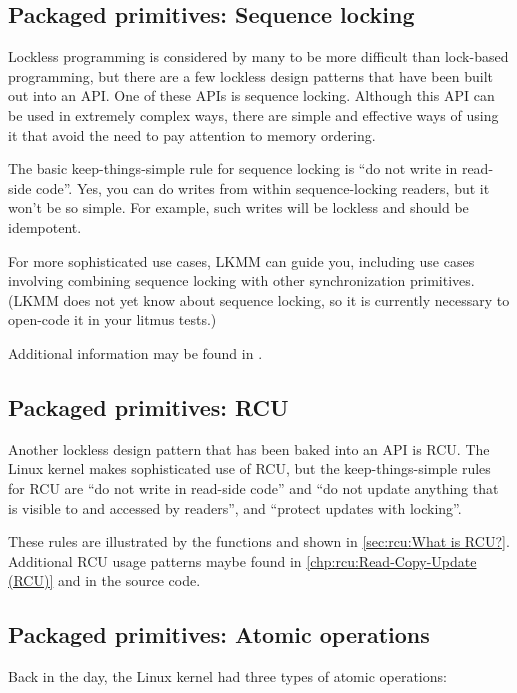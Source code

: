 \subsection{Packaged primitives: Sequence locking}

Lockless programming is considered by many to be more difficult than
lock-based programming, but there are a few lockless design patterns that
have been built out into an API\@.
One of these APIs is sequence locking.
Although this API can be used in extremely complex ways, there are simple
and effective ways of using it that avoid the need to pay attention to
memory ordering.

The basic keep-things-simple rule for sequence locking is ``do not write
in read-side code''.
Yes, you can do writes from within sequence-locking readers, but it
won't be so simple.
For example, such writes will be lockless and should be idempotent.

For more sophisticated use cases, LKMM can guide you, including use
cases involving combining sequence locking with other synchronization
primitives.
(LKMM does not yet know about sequence locking, so it is currently
necessary to open-code it in your litmus tests.)

Additional information may be found in .

\subsection{Packaged primitives: RCU}

Another lockless design pattern that has been baked into an API
is RCU\@.
The Linux kernel makes sophisticated use of RCU, but the
keep-things-simple rules for RCU are ``do not write in read-side code''
and ``do not update anything that is visible to and accessed by readers'',
and ``protect updates with locking''.

These rules are illustrated by the functions  and
 shown in
\cref{sec:rcu:What is RCU?}.
Additional RCU usage patterns maybe found in
\cref{chp:rcu:Read-Copy-Update (RCU)}
and in the source code.


\subsection{Packaged primitives: Atomic operations}

Back in the day, the Linux kernel had three types of atomic operations:

